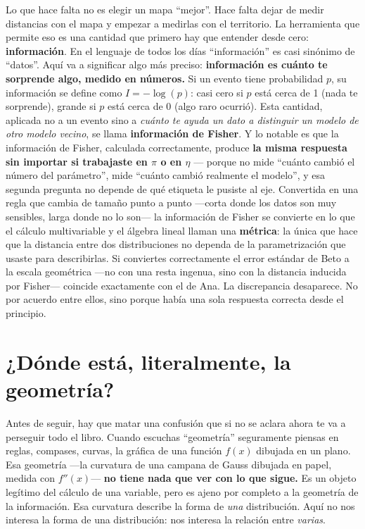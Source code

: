 Lo que hace falta no es elegir un mapa ``mejor''. Hace falta dejar de medir distancias con el mapa y empezar a medirlas con el territorio. La herramienta que permite eso es una cantidad que primero hay que entender desde cero: \textbf{información}. En el lenguaje de todos los días ``información'' es casi sinónimo de ``datos''. Aquí va a significar algo más preciso: \textbf{información es cuánto te sorprende algo, medido en números.} Si un evento tiene probabilidad $p$, su información se define como $I = -\log(p)$: casi cero si $p$ está cerca de 1 (nada te sorprende), grande si $p$ está cerca de 0 (algo raro ocurrió). Esta cantidad, aplicada no a un evento sino a \emph{cuánto te ayuda un dato a distinguir un modelo de otro modelo vecino}, se llama \textbf{información de Fisher}. Y lo notable es que la información de Fisher, calculada correctamente, produce \textbf{la misma respuesta sin importar si trabajaste en $\pi$ o en $\eta$} --- porque no mide ``cuánto cambió el número del parámetro'', mide ``cuánto cambió realmente el modelo'', y esa segunda pregunta no depende de qué etiqueta le pusiste al eje. Convertida en una regla que cambia de tamaño punto a punto ---corta donde los datos son muy sensibles, larga donde no lo son--- la información de Fisher se convierte en lo que el cálculo multivariable y el álgebra lineal llaman una \textbf{métrica}: la única que hace que la distancia entre dos distribuciones no dependa de la parametrización que usaste para describirlas. Si conviertes correctamente el error estándar de Beto a la escala geométrica ---no con una resta ingenua, sino con la distancia inducida por Fisher--- coincide exactamente con el de Ana. La discrepancia desaparece. No por acuerdo entre ellos, sino porque había una sola respuesta correcta desde el principio.

\section*{¿Dónde está, literalmente, la geometría?}

Antes de seguir, hay que matar una confusión que si no se aclara ahora te va a perseguir todo el libro. Cuando escuchas ``geometría'' seguramente piensas en reglas, compases, curvas, la gráfica de una función $f(x)$ dibujada en un plano. Esa geometría ---la curvatura de una campana de Gauss dibujada en papel, medida con $f''(x)$--- \textbf{no tiene nada que ver con lo que sigue.} Es un objeto legítimo del cálculo de una variable, pero es ajeno por completo a la geometría de la información. Esa curvatura describe la forma de \emph{una} distribución. Aquí no nos interesa la forma de una distribución: nos interesa la relación entre \emph{varias}.

